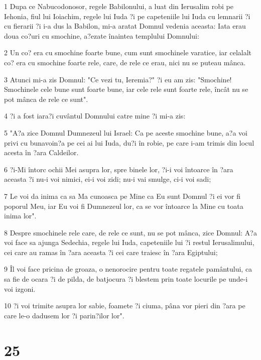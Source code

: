\par 1 Dupa ce Nabucodonosor, regele Babilonului, a luat din Ierusalim robi pe Iehonia, fiul lui Ioiachim, regele lui Iuda ?i pe capeteniile lui Iuda cu lemnarii ?i cu fierarii ?i i-a dus la Babilon, mi-a aratat Domnul vedenia aceasta: Iata erau doua co?uri cu smochine, a?ezate înaintea templului Domnului:
\par 2 Un co? era cu smochine foarte bune, cum sunt smochinele varatice, iar celalalt co? era cu smochine foarte rele, care, de rele ce erau, nici nu se puteau mânca.
\par 3 Atunci mi-a zis Domnul: "Ce vezi tu, Ieremia?" ?i eu am zis: "Smochine! Smochinele cele bune sunt foarte bune, iar cele rele sunt foarte rele, încât nu se pot mânca de rele ce sunt".
\par 4 ?i a fost iara?i cuvântul Domnului catre mine ?i mi-a zis:
\par 5 "A?a zice Domnul Dumnezeul lui Israel: Ca pe aceste smochine bune, a?a voi privi cu bunavoin?a pe cei ai lui Iuda, du?i în robie, pe care i-am trimis din locul acesta în ?ara Caldeilor.
\par 6 ?i-Mi întorc ochii Mei asupra lor, spre binele lor, ?i-i voi întoarce în ?ara aceasta ?i nu-i voi nimici, ei-i voi zidi; nu-i vai smulge, ci-i voi sadi;
\par 7 Le voi da inima ca sa Ma cunoasca pe Mine ca Eu sunt Domnul ?i ei vor fi poporul Meu, iar Eu voi fi Dumnezeul lor, ca se vor întoarce la Mine cu toata inima lor".
\par 8 Despre smochinele rele care, de rele ce sunt, nu se pot mânca, zice Domnul: A?a voi face sa ajunga Sedechia, regele lui Iuda, capeteniile lui ?i restul Ierusalimului, cei care au ramas în ?ara aceasta ?i cei care traiesc în ?ara Egiptului;
\par 9 Îl voi face pricina de groaza, o nenorocire pentru toate regatele pamântului, ca sa fie de ocara ?i de pilda, de batjocura ?i blestem prin toate locurile pe unde-i voi izgoni.
\par 10 ?i voi trimite asupra lor sabie, foamete ?i ciuma, pâna vor pieri din ?ara pe care le-o dadusem lor ?i parin?ilor lor".

\chapter{25}

